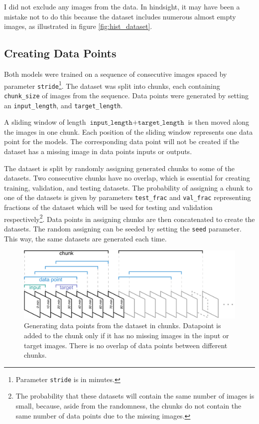 I did not exclude any images from the data. In hindsight, it may have been a mistake not to do this because the dataset includes numerous almost empty images, as illustrated in figure \ref{fig:hist_dataset}.

\subsection{Creating Data Points}
\label{sec:data_points}

Both models were trained on a sequence of consecutive images spaced by parameter \texttt{stride}\footnote{Parameter \texttt{stride} is in minutes.}. The dataset was split into chunks, each containing \texttt{chunk\_size} of images from the sequence. Data points were generated by setting an \texttt{input\_length}, and \texttt{target\_length}.

A sliding window of length $\texttt{input\_length} + \texttt{target\_length}$ is then moved along the images in one chunk. Each position of the sliding window represents one data point for the models. The corresponding data point will not be created if the dataset has a missing image in data points inputs or outputs.

The dataset is split by randomly assigning generated chunks to some of the datasets. Two consecutive chunks have no overlap, which is essential for creating training, validation, and testing datasets. The probability of assigning a chunk to one of the datasets is given by parameters \texttt{test\_frac} and \texttt{val\_frac} representing fractions of the dataset which will be used for testing and validation respectively\footnote{The probability that these datasets will contain the same number of images is small, because, aside from the randomness, the chunks do not contain the same number of data points due to the missing images.}. Data points in assigning chunks are then concatenated to create the datasets. The random assigning can be seeded by setting the \texttt{seed} parameter. This way, the same datasets are generated each time.

\begin{figure}[ht]
    \centering
    \includegraphics[width=\textwidth]{images/dataset.pdf}
    \caption[Process of generating data points from the dataset]{\label{fig:data_points}Generating data points from the dataset in chunks. Datapoint is added to the chunk only if it has no missing images in the input or target images. There is no overlap of data points between different chunks.}
\end{figure}

